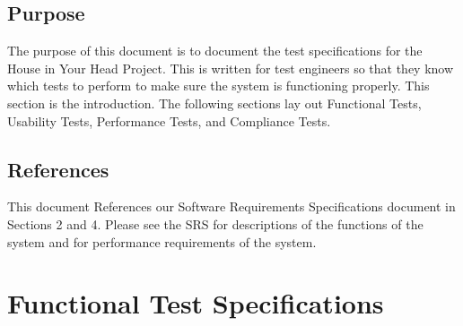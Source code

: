 \documentclass{article}
\begin{document}
\subsection{Purpose}

The purpose of this document is to document the test specifications for the House in Your Head Project. This is written for test engineers so that they know which tests to perform to make sure the system is functioning properly. This section is the introduction. The following sections lay out Functional Tests, Usability Tests, Performance Tests, and Compliance Tests.

\subsection{References}


This document References our Software Requirements Specifications document in Sections 2 and 4. Please see the SRS for descriptions of the functions of the system and for performance requirements of the system.

\newpage

\section{Functional Test Specifications}

\end{document}
